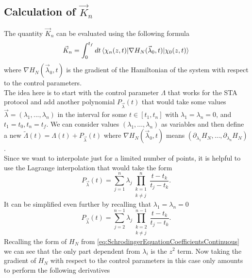\subsection{Calculation of $ \vec{ K }_{n} $ }
The quantity $ \vec{ K }_{n} $ can be evaluated using the following formula
\begin{equation}
\label{eq:Kns}
\vec{K}_{n} =  \int_{0}^{t_{f}} dt \braket{\chi_{n}(z,t)| \nabla H_{N}(\vec{ \lambda }_{0}, t)|\chi_{0}(z,t)} 
\end{equation}
where $ \nabla H_{N}(\vec{ \lambda }_{0}, t)$ is the gradient of the Hamiltonian of the system with respect to the control parameters.\\
The idea here is to start with the control parameter $ \Lambda $ that works for the STA protocol and add another polynomial $ P_{\vec{\lambda}}(t) $ that would take some values $ \vec{\lambda}  = (\lambda_{1},..., \lambda_{n})$ in the interval for some $ t \in [t_1, t_{n}] $ with $ \lambda_{1} = \lambda_{n} = 0 $, and $ t_{1}  = t_0 , t_{n} = t_{f} $.
We can consider values $ (\lambda_{1},..., \lambda_n) $ as variables and then define a new $ \tilde{\Lambda}(t) = \Lambda(t) +   P_{\vec{\lambda}}(t) $ where $ \nabla H_{N}(\vec{\lambda}_0,t) $ means $ (\partial_\lambda_1 H_{N},..., \partial_\lambda_{n} H_{N}) $   .\\
Since we want to interpolate just for a limited number of points, it is helpful to use the Lagrange interpolation that would take the form 
\begin{equation}
\label{eq:LagrangeInterpolationPolynomial}
P_{\vec{ \lambda }}(t) = \sum_{j=1}^{n}\lambda_{j}\prod_{\substack{k=1\\k\neq j }}^{n}\frac{t-t_{k}}{t_{j} - t_{k}}.
\end{equation}
It can be simplified even further by recalling that $ \lambda_{1} = \lambda_{n} = 0 $
\begin{equation}
\label{eq:LagrangeInterpolationPolynomialSimplified}
P_{\vec{ \lambda }}(t) = \sum_{j=2}^{n-1}\lambda_{j}\prod_{\substack{k=2\\k\neq j }}^{n-1}\frac{t-t_{k}}{t_{j} - t_{k}}.
\end{equation}
Recalling the form of $   H_{N} $ from \cref{eq:SchrodingerEquationCoefficientsContinuous} we can see that the only part dependent from $ \lambda_{i} $ is the $ z^2 $ term.
Now taking the gradient of $ H_{N} $ with respect to the control parameters in this case only amounts to perform the following derivatives 
